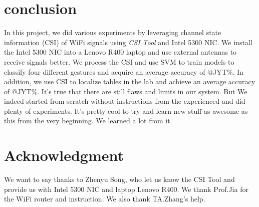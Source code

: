 \documentclass[conference]{IEEEtran}
\begin{document}
\section{conclusion} \label{section-conclusion}
In this project, we did various experiments by leveraging channel state information (CSI) of WiFi signals using \emph{CSI Tool} and Intel 5300 NIC.
We install the Intel 5300 NIC into a Lenovo R400 laptop and use external antennas to receive signals better.
We process the CSI and use SVM to train models to classify four different gestures and acquire an average accuracy of @JYT\%.
In addition, we use CSI to localize tables in the lab and achieve an average accuracy of @JYT\%.
It's true that there are still flaws and limits in our system. But We indeed started from scratch without instructions from the experienced and did plenty of experiments. It's pretty cool to try and learn new stuff as awesome as this from the very beginning. We learned a lot from it.

\section*{Acknowledgment}
We want to say thanks to Zhenyu Song, who let us know the CSI Tool and provide us with Intel 5300 NIC and laptop Lenovo R400. We thank Prof.Jia for the WiFi router and instruction. We also thank TA.Zhang's help.



\end{document}
